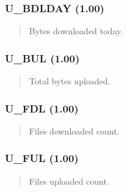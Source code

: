 \documentclass[letterpaper,10pt,english]{sphinxmanual}
\begin{document}
\subsubsection{U\_BDLDAY (1.00)}
\label{\detokenize{ppl:u-bdlday-1-00}}\begin{quote}

\sphinxAtStartPar
{}
\begin{description}
\sphinxAtStartPar
Bytes downloaded today.

\end{description}
\end{quote}


\subsubsection{U\_BUL (1.00)}
\label{\detokenize{ppl:u-bul-1-00}}\begin{quote}

\sphinxAtStartPar
{}
\begin{description}
\sphinxAtStartPar
Total bytes uploaded.

\end{description}
\end{quote}


\subsubsection{U\_FDL (1.00)}
\label{\detokenize{ppl:u-fdl-1-00}}\begin{quote}

\sphinxAtStartPar
{}
\begin{description}
\sphinxAtStartPar
Files downloaded count.

\end{description}
\end{quote}


\subsubsection{U\_FUL (1.00)}
\label{\detokenize{ppl:u-ful-1-00}}\begin{quote}

\sphinxAtStartPar
{}
\begin{description}
\sphinxAtStartPar
Files uploaded count.

\end{description}
\end{quote}
\end{document}
